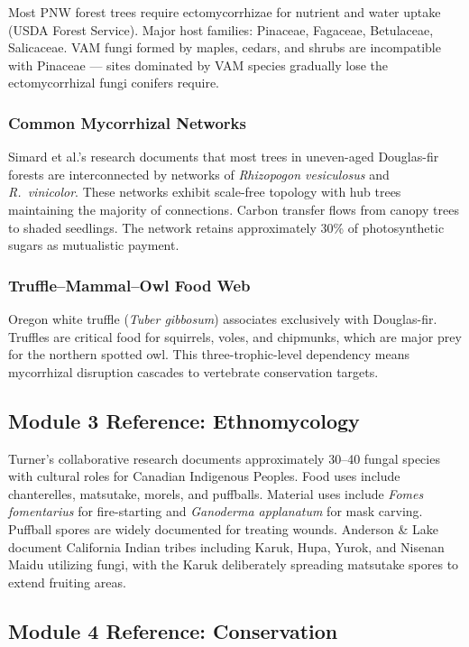 \documentclass[11pt,letterpaper]{article}
\begin{document}
Most PNW forest trees require ectomycorrhizae for nutrient and water uptake (USDA Forest Service). Major host families: Pinaceae, Fagaceae, Betulaceae, Salicaceae. VAM fungi formed by maples, cedars, and shrubs are incompatible with Pinaceae --- sites dominated by VAM species gradually lose the ectomycorrhizal fungi conifers require.

\subsubsection{Common Mycorrhizal Networks}

Simard et al.'s research documents that most trees in uneven-aged Douglas-fir forests are interconnected by networks of \textit{Rhizopogon vesiculosus} and \textit{R.~vinicolor}. These networks exhibit scale-free topology with hub trees maintaining the majority of connections. Carbon transfer flows from canopy trees to shaded seedlings. The network retains approximately 30\% of photosynthetic sugars as mutualistic payment.

\subsubsection{Truffle--Mammal--Owl Food Web}

Oregon white truffle (\textit{Tuber gibbosum}) associates exclusively with Douglas-fir. Truffles are critical food for squirrels, voles, and chipmunks, which are major prey for the northern spotted owl. This three-trophic-level dependency means mycorrhizal disruption cascades to vertebrate conservation targets.

\subsection{Module 3 Reference: Ethnomycology}

Turner's collaborative research documents approximately 30--40 fungal species with cultural roles for Canadian Indigenous Peoples. Food uses include chanterelles, matsutake, morels, and puffballs. Material uses include \textit{Fomes fomentarius} for fire-starting and \textit{Ganoderma applanatum} for mask carving. Puffball spores are widely documented for treating wounds. Anderson \& Lake document California Indian tribes including Karuk, Hupa, Yurok, and Nisenan Maidu utilizing fungi, with the Karuk deliberately spreading matsutake spores to extend fruiting areas.

\subsection{Module 4 Reference: Conservation}
\end{document}
